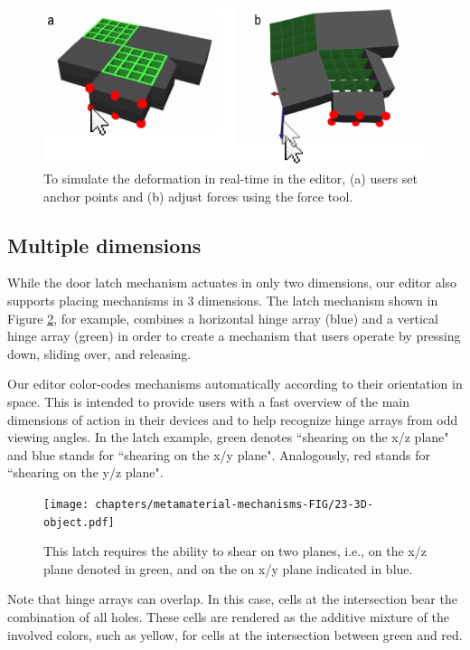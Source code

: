 \begin{figure} [h]
    \includegraphics[width=\textwidth]{chapters/metamaterial-mechanisms-FIG/22-simulation-walkthrough.pdf}
    \caption[Short figure name.]{To simulate the deformation in real-time in the editor, (a) users set anchor points and (b) adjust forces using the force tool. 
    \label{fig:22-simulation-walkthrough}}
\end{figure}

\subsection{Multiple dimensions}
While the door latch mechanism actuates in only two dimensions, our editor also supports placing mechanisms in 3 dimensions. The latch mechanism shown in Figure \ref{fig:23-3D-object}, for example, combines a horizontal hinge array (blue) and a vertical hinge array (green) in order to create a mechanism that users operate by pressing down, sliding over, and releasing. 

Our editor color-codes mechanisms automatically according to their orientation in space. This is intended to provide users with a fast overview of the main dimensions of action in their devices and to help recognize hinge arrays from odd viewing angles. In the latch example, green denotes ``shearing on the x/z plane" and blue stands for ``shearing on the x/y plane". Analogously, red stands for ``shearing on the y/z plane".

\begin{figure} [h]
    \texttt{[image: chapters/metamaterial-mechanisms-FIG/23-3D-object.pdf]}
    \caption[Short figure name.]{This latch requires the ability to shear on two planes, i.e., on the x/z plane denoted in green, and on the on x/y plane indicated in blue.
    \label{fig:23-3D-object}}
\end{figure}

Note that hinge arrays can overlap. In this case, cells at the intersection bear the combination of all holes. These cells are rendered as the additive mixture of the involved colors, such as yellow, for cells at the intersection between green and red.


